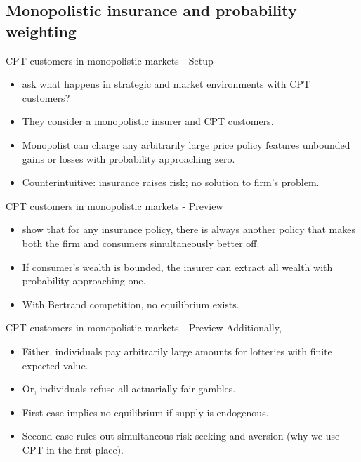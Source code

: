 \documentclass[11pt, aspectratio=169]{beamer}
\begin{document}


\subsection{Monopolistic insurance and probability weighting}
    \begin{frame}{CPT customers in monopolistic markets - Setup}
        \begin{itemize}
            \item \citet{AzevedoGottlieb2012} ask what happens in strategic and market environments with CPT customers?\bigskip
            \item They consider a monopolistic insurer and CPT customers.\bigskip
                \item Monopolist can charge any arbitrarily large price policy features unbounded gains or losses with probability approaching zero.\bigskip
                \item Counterintuitive: insurance raises risk; no solution to firm's problem.\medskip
        \end{itemize}
    \end{frame}

    \begin{frame}{CPT customers in monopolistic markets - Preview}
        \begin{itemize}
            \item \citet{AzevedoGottlieb2012} show that for any insurance policy, there is always another policy that makes both the firm and consumers simultaneously better off.\bigskip
            \item If consumer's wealth is bounded, the insurer can extract all wealth with probability approaching one.\bigskip
            \item With Bertrand competition, no equilibrium exists.\bigskip
        \end{itemize}
    \end{frame}



    \begin{frame}{CPT customers in monopolistic markets - Preview}
        Additionally,\medskip
           \begin{itemize}
               \item Either, individuals pay arbitrarily large amounts for lotteries with finite expected value.\bigskip
               \item Or, individuals refuse all actuarially fair gambles.\bigskip
               \item First case implies no equilibrium if supply is endogenous.\bigskip
               \item Second case rules out simultaneous risk-seeking and aversion (why we use CPT in the first place).\bigskip
           \end{itemize}
       \end{frame}
\end{document}
